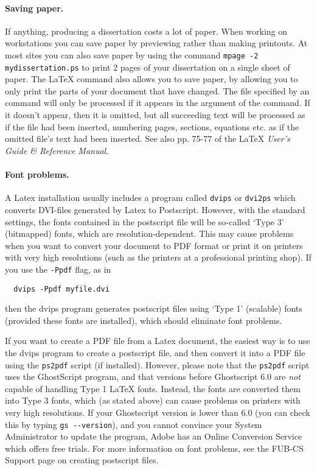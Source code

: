 \paragraph*{Saving paper.}
If anything, producing a dissertation costs a lot of paper.
When working on workstations you can save paper by previewing
rather than making printouts. At most sites you can also
save paper by using the command {\tt mpage -2 mydissertation.ps}
to print 2 pages of your dissertation on a single sheet of paper.
The \LaTeX{} command \verb||
also allows you to save paper,
by allowing you to only print the parts of your document that have changed.
The file specified by an \verb|| command will only be processed if
it appears in the argument of the \verb|| command.
If it doesn't appear, then it is omitted, but all succeeding text will be
processed as if the file had been inserted, numbering pages, sections,
equations etc. as if the omitted file's text had been inserted.
See also pp. 75-77 of the \LaTeX{} {\em User's Guide \& Reference Manual\/}.

\paragraph*{Font problems.}
A Latex installation usually includes a program called 
\verb|dvips| or \verb|dvi2ps|
which converts DVI-files generated by Latex to Postscript.
However, with the standard settings, the fonts contained
in the postscript file will be so-called `Type 3' (bitmapped) fonts, 
which are resolution-dependent. This may cause problems when you want 
to convert your document to PDF format or print it on printers with
very high resolutions (such as the printers at a professional printing
shop).
If you use the \verb|-Ppdf| flag, as in
\begin{verbatim}
  dvips -Ppdf myfile.dvi
\end{verbatim}
then the dvips program generates postscript files using
`Type 1' (scalable) fonts (provided these fonts are installed),
which should eliminate font problems.

If you want to create a PDF file from a Latex document, the easiest way is 
to use the dvips program to create a postscript file, and then convert
it into a PDF file using the \verb|ps2pdf| script (if installed). 
However, please note that
the \verb|ps2pdf| script uses the GhostScript program, and that versions
before Ghostscript 6.0 are \emph{not} capable of handling Type 1
LaTeX fonts. Instead, the fonts are converted them into Type 3 fonts, 
which (as stated above) can cause problems on printers with very high
resolutions. If your Ghostscript version is lower than 6.0
(you can check this by typing \verb|gs --version|),
and you cannot convince your System Administrator to update the
program, 
Adobe has an Online Conversion Service which offers free trials.
For more information on font problems, 
see the FUB-CS Support page on creating postscript files.
